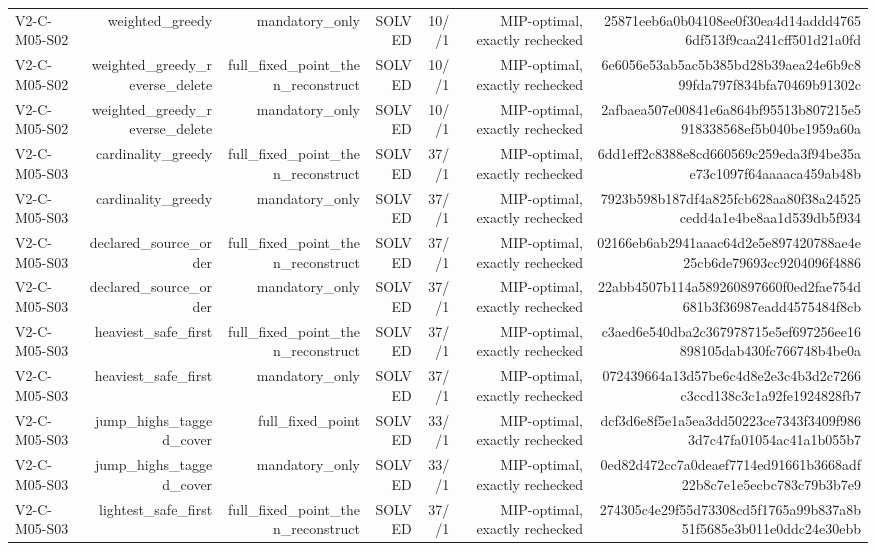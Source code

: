 {\begin{longtable}{lrrrrrr}
V2-C-M05-S02 & weighted\_greedy & mandatory\_only & SOLVED & 10//1 & MIP-optimal, exactly rechecked & 25871eeb6a0b04108ee0f30ea4d14addd47656df513f9caa241cff501d21a0fd \\
V2-C-M05-S02 & weighted\_greedy\_reverse\_delete & full\_fixed\_point\_then\_reconstruct & SOLVED & 10//1 & MIP-optimal, exactly rechecked & 6e6056e53ab5ac5b385bd28b39aea24e6b9c899fda797f834bfa70469b91302c \\
V2-C-M05-S02 & weighted\_greedy\_reverse\_delete & mandatory\_only & SOLVED & 10//1 & MIP-optimal, exactly rechecked & 2afbaea507e00841e6a864bf95513b807215e5918338568ef5b040be1959a60a \\
V2-C-M05-S03 & cardinality\_greedy & full\_fixed\_point\_then\_reconstruct & SOLVED & 37//1 & MIP-optimal, exactly rechecked & 6dd1eff2c8388e8cd660569c259eda3f94be35ae73c1097f64aaaaca459ab48b \\
V2-C-M05-S03 & cardinality\_greedy & mandatory\_only & SOLVED & 37//1 & MIP-optimal, exactly rechecked & 7923b598b187df4a825fcb628aa80f38a24525cedd4a1e4be8aa1d539db5f934 \\
V2-C-M05-S03 & declared\_source\_order & full\_fixed\_point\_then\_reconstruct & SOLVED & 37//1 & MIP-optimal, exactly rechecked & 02166eb6ab2941aaac64d2e5e897420788ae4e25cb6de79693cc9204096f4886 \\
V2-C-M05-S03 & declared\_source\_order & mandatory\_only & SOLVED & 37//1 & MIP-optimal, exactly rechecked & 22abb4507b114a589260897660f0ed2fae754d681b3f36987eadd4575484f8cb \\
V2-C-M05-S03 & heaviest\_safe\_first & full\_fixed\_point\_then\_reconstruct & SOLVED & 37//1 & MIP-optimal, exactly rechecked & c3aed6e540dba2c367978715e5ef697256ee16898105dab430fc766748b4be0a \\
V2-C-M05-S03 & heaviest\_safe\_first & mandatory\_only & SOLVED & 37//1 & MIP-optimal, exactly rechecked & 072439664a13d57be6c4d8e2e3c4b3d2c7266c3ccd138c3c1a92fe1924828fb7 \\
V2-C-M05-S03 & jump\_highs\_tagged\_cover & full\_fixed\_point & SOLVED & 33//1 & MIP-optimal, exactly rechecked & dcf3d6e8f5e1a5ea3dd50223ce7343f3409f9863d7c47fa01054ac41a1b055b7 \\
V2-C-M05-S03 & jump\_highs\_tagged\_cover & mandatory\_only & SOLVED & 33//1 & MIP-optimal, exactly rechecked & 0ed82d472cc7a0deaef7714ed91661b3668adf22b8c7e1e5ecbc783c79b3b7e9 \\
V2-C-M05-S03 & lightest\_safe\_first & full\_fixed\_point\_then\_reconstruct & SOLVED & 37//1 & MIP-optimal, exactly rechecked & 274305c4e29f55d73308cd5f1765a99b837a8b51f5685e3b011e0ddc24e30ebb \\

\end{longtable}}
